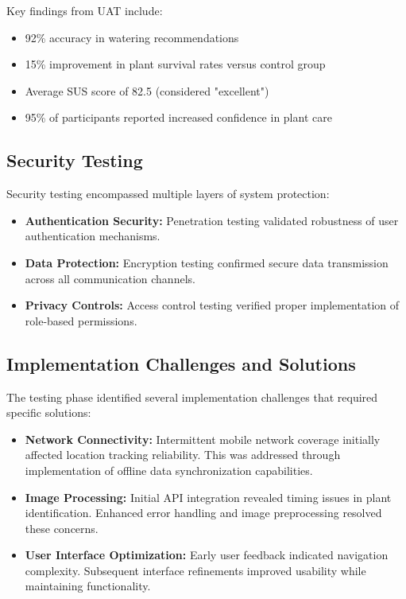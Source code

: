 \documentclass[conference]{IEEEtran}
\begin{document}
Key findings from UAT include:
\begin{itemize}
    \item 92\% accuracy in watering recommendations
    \item 15\% improvement in plant survival rates versus control group
    \item Average SUS score of 82.5 (considered "excellent")
    \item 95\% of participants reported increased confidence in plant care
\end{itemize}

\subsection{Security Testing}
Security testing encompassed multiple layers of system protection:
\begin{itemize}
    \item \textbf{Authentication Security:} Penetration testing validated robustness of user authentication mechanisms.
    \item \textbf{Data Protection:} Encryption testing confirmed secure data transmission across all communication channels.
    \item \textbf{Privacy Controls:} Access control testing verified proper implementation of role-based permissions.
\end{itemize}

\subsection{Implementation Challenges and Solutions}
The testing phase identified several implementation challenges that required specific solutions:

\begin{itemize}
    \item \textbf{Network Connectivity:} Intermittent mobile network coverage initially affected location tracking reliability. This was addressed through implementation of offline data synchronization capabilities.
    \item \textbf{Image Processing:} Initial API integration revealed timing issues in plant identification. Enhanced error handling and image preprocessing resolved these concerns.
    \item \textbf{User Interface Optimization:} Early user feedback indicated navigation complexity. Subsequent interface refinements improved usability while maintaining functionality.
\end{itemize}
\end{document}
